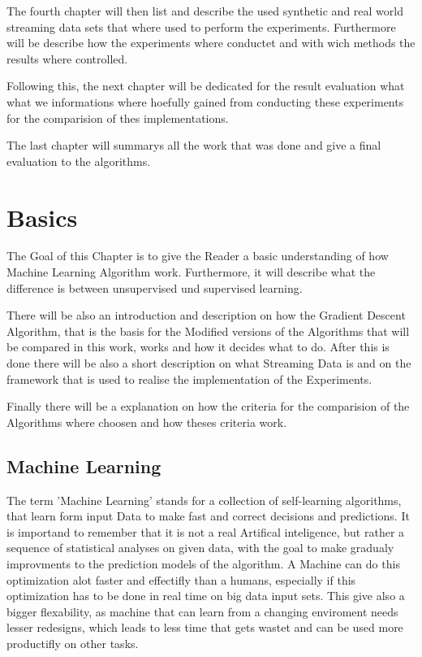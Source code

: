 \documentclass[12pt,oneside,a4paper,parskip]{scrbook}
\begin{document}
The fourth chapter will then list and describe the used synthetic and real world streaming data sets that where used to 
perform the experiments.
Furthermore will be describe how the experiments where conductet and with wich methods the results where controlled.

Following this, the next chapter will be dedicated for the result evaluation what what we informations where hoefully gained
from conducting these experiments for the comparision of thes implementations.

The last chapter will summarys all the work that was done and give a final evaluation to the algorithms.

\chapter{Basics}
The Goal of this Chapter is to give the Reader a basic understanding of how Machine Learning Algorithm work. 
Furthermore, it will describe what the difference is between unsupervised und supervised learning. 

There will be also an introduction and description on how the Gradient Descent Algorithm, that is the basis for the 
Modified versions of the Algorithms that will be compared in this work, works and how it decides what to do. 
After this is done there will be also a short description on what Streaming Data is and on the framework that is used to 
realise the implementation of the Experiments.

Finally there will be a explanation on how the criteria for the comparision of the Algorithms where choosen and how 
theses criteria work.

\section{Machine Learning}

The term 'Machine Learning' stands for a collection of self-learning algorithms, that learn form input Data to make 
fast and correct decisions and predictions. It is importand to remember that it is not a real Artifical inteligence, 
but rather a sequence of statistical analyses on given data, with the goal to make gradualy improvments to the prediction 
models of the algorithm.  
A Machine can do this optimization alot faster and effectifly than a humans, especially if this optimization has to be 
done in real time on big data input sets. This give also a bigger flexability, as machine that can learn from a changing 
enviroment needs lesser redesigns, which leads to less time that gets wastet and can be used more productifly on other 
tasks. 
\end{document}

